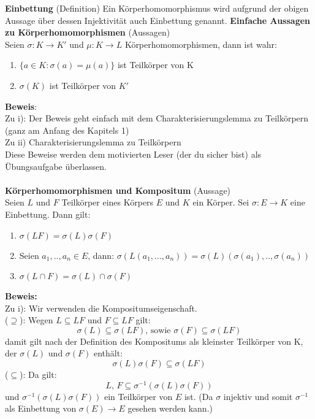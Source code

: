 \documentclass[a4paper, 10pt]{scrartcl}
\begin{document}
\textbf{Einbettung} (Definition) \newline
Ein Körperhomomorphismus wird aufgrund der obigen Aussage über dessen Injektivität auch Einbettung genannt.
\newline
\newline
\textbf{Einfache Aussagen zu Körperhomomorphismen} (Aussagen)\\
Seien $\sigma : K \rightarrow K'$ und $\mu : K \rightarrow L$ Körperhomomorphismen, dann ist wahr:
\begin{enumerate}[label=\roman*)]
\item $\{a \in K : \sigma (a) = \mu (a) \}$ ist Teilkörper von K
\item $\sigma(K)$ ist Teilkörper von $K'$
\end{enumerate}
\textbf{Beweis}: \\
Zu i): Der Beweis geht einfach mit dem Charakterisierungslemma zu Teilkörpern (ganz am Anfang des Kapitels 1)\\
Zu ii) Charakterisierungslemma zu Teilkörpern\\
Diese Beweise werden dem motivierten Leser (der du sicher bist) als Übungsaufgabe überlassen.\\\\
\textbf{Körperhomomorphismen und Kompositum} (Aussage) \\
Seien $L$ und $F$ Teilkörper eines Körpers $E$ und $K$ ein Körper. Sei $\sigma : E \rightarrow	K$ eine Einbettung. Dann gilt:
\begin{enumerate}[label=\roman*)]
\item $\sigma(LF) = \sigma(L) \sigma(F)$
\item Seien $a_1,..,a_n \in E$, dann: $\sigma(L(a_1,...,a_n)) = \sigma(L) (\sigma(a_1),..,\sigma(a_n))$
\item $\sigma(L \cap F) = \sigma(L) \cap \sigma(F)$
\end{enumerate}
\textbf{Beweis:}\\
Zu i): Wir verwenden die Kompositumseigenschaft.\\
($\supseteq$): Wegen $L \subseteq LF$ und $F \subseteq LF$ gilt: $$\sigma (L) \subseteq \sigma(LF) \text{, sowie } \sigma(F) \subseteq \sigma(LF)$$ damit gilt nach der Definition des Kompositums als kleinster Teilkörper von K, der $\sigma(L) \text{ und } \sigma(F)$ enthält:
$$\sigma(L) \sigma(F) \subseteq \sigma(LF)$$
($\subseteq$): Da gilt: $$L \text{, } F \subseteq \sigma^{-1} (\sigma(L) \sigma(F))$$ und $\sigma^{-1} (\sigma(L) \sigma(F))$ ein Teilkörper von $E$ ist. (Da $\sigma$ injektiv und somit $\sigma^{-1}$ als Einbettung von $\sigma(E) \rightarrow E$ gesehen werden kann.)\newline
\end{document}
